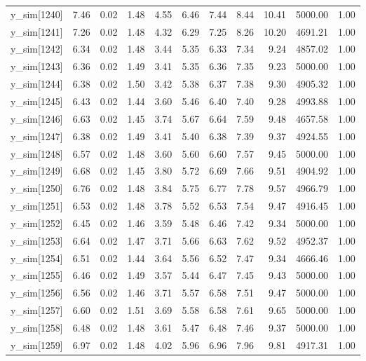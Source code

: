 \begin{table}[ht]
\begin{tabular}{rrrrrrrrrrr}
  y\_sim[1240] & 7.46 & 0.02 & 1.48 & 4.55 & 6.46 & 7.44 & 8.44 & 10.41 & 5000.00 & 1.00 \\ 
  y\_sim[1241] & 7.26 & 0.02 & 1.48 & 4.32 & 6.29 & 7.25 & 8.26 & 10.20 & 4691.21 & 1.00 \\ 
  y\_sim[1242] & 6.34 & 0.02 & 1.48 & 3.44 & 5.35 & 6.33 & 7.34 & 9.24 & 4857.02 & 1.00 \\ 
  y\_sim[1243] & 6.36 & 0.02 & 1.49 & 3.41 & 5.35 & 6.36 & 7.35 & 9.23 & 5000.00 & 1.00 \\ 
  y\_sim[1244] & 6.38 & 0.02 & 1.50 & 3.42 & 5.38 & 6.37 & 7.38 & 9.30 & 4905.32 & 1.00 \\ 
  y\_sim[1245] & 6.43 & 0.02 & 1.44 & 3.60 & 5.46 & 6.40 & 7.40 & 9.28 & 4993.88 & 1.00 \\ 
  y\_sim[1246] & 6.63 & 0.02 & 1.45 & 3.74 & 5.67 & 6.64 & 7.59 & 9.48 & 4657.58 & 1.00 \\ 
  y\_sim[1247] & 6.38 & 0.02 & 1.49 & 3.41 & 5.40 & 6.38 & 7.39 & 9.37 & 4924.55 & 1.00 \\ 
  y\_sim[1248] & 6.57 & 0.02 & 1.48 & 3.60 & 5.60 & 6.60 & 7.57 & 9.45 & 5000.00 & 1.00 \\ 
  y\_sim[1249] & 6.68 & 0.02 & 1.45 & 3.80 & 5.72 & 6.69 & 7.66 & 9.51 & 4904.92 & 1.00 \\ 
  y\_sim[1250] & 6.76 & 0.02 & 1.48 & 3.84 & 5.75 & 6.77 & 7.78 & 9.57 & 4966.79 & 1.00 \\ 
  y\_sim[1251] & 6.53 & 0.02 & 1.48 & 3.78 & 5.52 & 6.53 & 7.54 & 9.47 & 4916.45 & 1.00 \\ 
  y\_sim[1252] & 6.45 & 0.02 & 1.46 & 3.59 & 5.48 & 6.46 & 7.42 & 9.34 & 5000.00 & 1.00 \\ 
  y\_sim[1253] & 6.64 & 0.02 & 1.47 & 3.71 & 5.66 & 6.63 & 7.62 & 9.52 & 4952.37 & 1.00 \\ 
  y\_sim[1254] & 6.51 & 0.02 & 1.44 & 3.64 & 5.56 & 6.52 & 7.47 & 9.34 & 4666.46 & 1.00 \\ 
  y\_sim[1255] & 6.46 & 0.02 & 1.49 & 3.57 & 5.44 & 6.47 & 7.45 & 9.43 & 5000.00 & 1.00 \\ 
  y\_sim[1256] & 6.56 & 0.02 & 1.46 & 3.71 & 5.57 & 6.58 & 7.51 & 9.47 & 5000.00 & 1.00 \\ 
  y\_sim[1257] & 6.60 & 0.02 & 1.51 & 3.69 & 5.58 & 6.58 & 7.61 & 9.65 & 5000.00 & 1.00 \\ 
  y\_sim[1258] & 6.48 & 0.02 & 1.48 & 3.61 & 5.47 & 6.48 & 7.46 & 9.37 & 5000.00 & 1.00 \\ 
  y\_sim[1259] & 6.97 & 0.02 & 1.48 & 4.02 & 5.96 & 6.96 & 7.96 & 9.81 & 4917.31 & 1.00 \\ 

\end{tabular}
\end{table}
